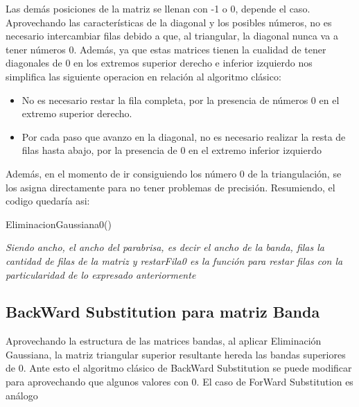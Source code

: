Las demás posiciones de la matriz se llenan con -1 o 0, depende el caso.\\ 
Aprovechando las características de la diagonal y los posibles números, no es necesario intercambiar filas debido a que, al triangular, la diagonal nunca va a tener números 0. Además, ya que estas matrices tienen la cualidad de tener diagonales de 0 en los extremos superior derecho e inferior izquierdo nos simplifica las siguiente operacion en relación al algoritmo clásico:

\begin{itemize}
\item No es necesario restar la fila completa, por la presencia de números 0 en el extremo superior derecho.
\item Por cada paso que avanzo en la diagonal, no es necesario realizar la resta de filas hasta abajo, por la presencia de 0 en el extremo inferior izquierdo  
\end{itemize}

Además, en el momento de ir consiguiendo los número 0 de la triangulación, se los asigna directamente para no tener problemas de precisión. Resumiendo, el codigo quedaría asi:\\

\begin{algorithm}[H]
\caption{EliminacionGaussiana0()}
\begin{algorithmic}[1]

    
    $}
    
        \State coeficiente = (Obtener(i,j)/Obtener(j,j));
		\State RestarFila0(coeficiente, j, i, j+1);
		
	\EndFor 
    \State cerosAIzquierda(j,j);
	
	\EndFor
	
\end{algorithmic}
\end{algorithm}


\textit{Siendo ancho, el ancho del parabrisa, es decir el ancho de la banda, filas la cantidad de filas de la matriz y restarFila0 es la función para restar filas con la particularidad de lo expresado anteriormente}
	
\subsection{BackWard Substitution para matriz Banda}
Aprovechando la estructura de las matrices bandas, al aplicar Eliminación Gaussiana, la matriz triangular superior resultante hereda las bandas superiores de 0. Ante esto el algoritmo clásico de BackWard Substitution se puede modificar para aprovechando que algunos valores con 0. El caso de ForWard Substitution es análogo



